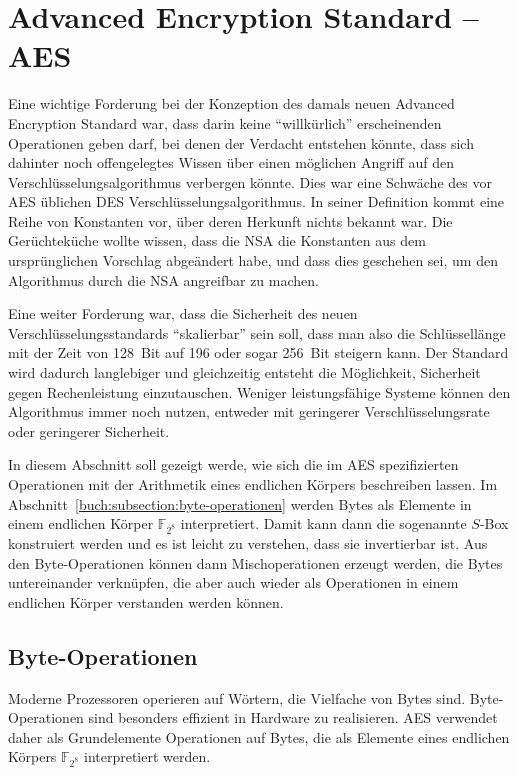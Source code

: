 %
%
%
\section{Advanced Encryption Standard -- AES
\label{buch:section:aes}}
Eine wichtige Forderung bei der Konzeption des damals neuen
Advanced Encryption Standard war, dass darin keine ``willkürlich''
erscheinenden Operationen geben darf, bei denen der Verdacht
entstehen könnte, dass sich dahinter noch offengelegtes Wissen
über einen möglichen Angriff auf den Verschlüsselungsalgorithmus
verbergen könnte.
Dies war eine Schwäche des vor AES üblichen DES Verschlüsselungsalgorithmus.
In seiner Definition kommt eine Reihe von Konstanten vor, über deren
Herkunft nichts bekannt war.
Die Gerüchteküche wollte wissen, dass die NSA die Konstanten aus dem
ursprünglichen Vorschlag abgeändert habe, und dass dies geschehen sei,
um den Algorithmus durch die NSA angreifbar zu machen.

Eine weiter Forderung war, dass die Sicherheit des neuen
Verschlüsselungsstandards ``skalierbar'' sein soll, dass man also
die Schlüssellänge mit der Zeit von 128~Bit auf 196 oder sogar 256~Bit
steigern kann.
Der Standard wird dadurch langlebiger und gleichzeitig entsteht die
Möglichkeit, Sicherheit gegen Rechenleistung einzutauschen.
Weniger leistungsfähige Systeme können den Algorithmus immer noch
nutzen, entweder mit geringerer Verschlüsselungsrate oder geringerer
Sicherheit.

In diesem Abschnitt soll gezeigt werde, wie sich die im AES
spezifizierten Operationen mit der Arithmetik 
eines endlichen Körpers beschreiben lassen.
Im Abschnitt~\ref{buch:subsection:byte-operationen} werden
Bytes als Elemente in einem endlichen Körper $\mathbb{F}_{2^8}$
interpretiert.
Damit kann dann die sogenannte $S$-Box konstruiert werden und
es ist leicht zu verstehen, dass sie invertierbar ist.
Aus den Byte-Operationen können dann Mischoperationen erzeugt
werden, die Bytes untereinander verknüpfen, die aber auch wieder
als Operationen in einem endlichen Körper verstanden werden können.

\subsection{Byte-Operationen
\label{buch:subsection:byte-operationen}}
Moderne Prozessoren operieren auf Wörtern, die Vielfache von Bytes sind.
Byte-Operationen sind besonders effizient in Hardware zu realisieren.
AES verwendet daher als Grundelemente Operationen auf Bytes, die als
Elemente eines endlichen Körpers $\mathbb{F}_{2^8}$ interpretiert werden.

